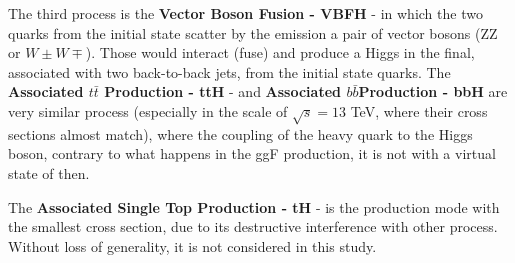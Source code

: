 The third process is the \textbf{Vector Boson Fusion - VBFH} - in which the two quarks from the initial state scatter by the emission a pair of vector bosons (ZZ or $W{\pm}W{\mp}$). Those would interact (fuse) and produce a Higgs in the final, associated with two back-to-back jets, from the initial state quarks. The \textbf{Associated $t\bar{t}$ Production - ttH} - and \textbf{Associated $b\bar{b}$Production - bbH} are very similar process (especially in the scale of $\sqrt{s} = 13$ TeV, where their cross sections almost match), where the coupling of the heavy quark to the Higgs boson, contrary to what happens in the ggF production, it is not with a virtual state of then. 

The \textbf{Associated Single Top Production - tH} - is the production mode with the smallest cross section, due to its destructive interference with other process. Without loss of generality, it is not considered in this study.


